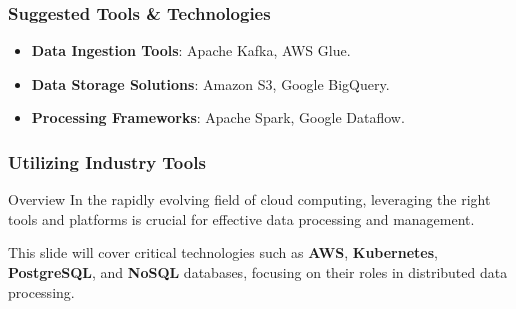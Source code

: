\documentclass[aspectratio=169]{beamer}
\begin{document}
\begin{frame}[fragile]
    \frametitle{Suggested Tools \& Technologies}
    \begin{itemize}
        \item \textbf{Data Ingestion Tools}: Apache Kafka, AWS Glue.
        \item \textbf{Data Storage Solutions}: Amazon S3, Google BigQuery.
        \item \textbf{Processing Frameworks}: Apache Spark, Google Dataflow.
    \end{itemize}
\end{frame}

\begin{frame}
    \frametitle{Utilizing Industry Tools}
    \begin{block}{Overview}
        In the rapidly evolving field of cloud computing, leveraging the right tools and platforms is crucial for effective data processing and management. 
    \end{block}
    This slide will cover critical technologies such as \textbf{AWS}, \textbf{Kubernetes}, \textbf{PostgreSQL}, and \textbf{NoSQL} databases, focusing on their roles in distributed data processing.
\end{frame}
\end{document}
